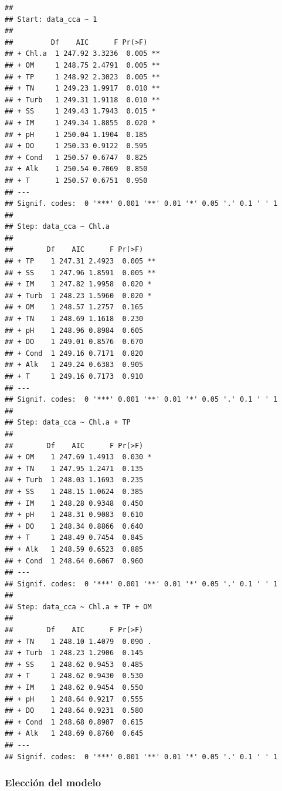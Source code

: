 \documentclass[
]{book}
\begin{document}
\begin{verbatim}
## 
## Start: data_cca ~ 1 
## 
##         Df    AIC      F Pr(>F)   
## + Chl.a  1 247.92 3.3236  0.005 **
## + OM     1 248.75 2.4791  0.005 **
## + TP     1 248.92 2.3023  0.005 **
## + TN     1 249.23 1.9917  0.010 **
## + Turb   1 249.31 1.9118  0.010 **
## + SS     1 249.43 1.7943  0.015 * 
## + IM     1 249.34 1.8855  0.020 * 
## + pH     1 250.04 1.1904  0.185   
## + DO     1 250.33 0.9122  0.595   
## + Cond   1 250.57 0.6747  0.825   
## + Alk    1 250.54 0.7069  0.850   
## + T      1 250.57 0.6751  0.950   
## ---
## Signif. codes:  0 '***' 0.001 '**' 0.01 '*' 0.05 '.' 0.1 ' ' 1
## 
## Step: data_cca ~ Chl.a 
## 
##        Df    AIC      F Pr(>F)   
## + TP    1 247.31 2.4923  0.005 **
## + SS    1 247.96 1.8591  0.005 **
## + IM    1 247.82 1.9958  0.020 * 
## + Turb  1 248.23 1.5960  0.020 * 
## + OM    1 248.57 1.2757  0.165   
## + TN    1 248.69 1.1618  0.230   
## + pH    1 248.96 0.8984  0.605   
## + DO    1 249.01 0.8576  0.670   
## + Cond  1 249.16 0.7171  0.820   
## + Alk   1 249.24 0.6383  0.905   
## + T     1 249.16 0.7173  0.910   
## ---
## Signif. codes:  0 '***' 0.001 '**' 0.01 '*' 0.05 '.' 0.1 ' ' 1
## 
## Step: data_cca ~ Chl.a + TP 
## 
##        Df    AIC      F Pr(>F)  
## + OM    1 247.69 1.4913  0.030 *
## + TN    1 247.95 1.2471  0.135  
## + Turb  1 248.03 1.1693  0.235  
## + SS    1 248.15 1.0624  0.385  
## + IM    1 248.28 0.9348  0.450  
## + pH    1 248.31 0.9083  0.610  
## + DO    1 248.34 0.8866  0.640  
## + T     1 248.49 0.7454  0.845  
## + Alk   1 248.59 0.6523  0.885  
## + Cond  1 248.64 0.6067  0.960  
## ---
## Signif. codes:  0 '***' 0.001 '**' 0.01 '*' 0.05 '.' 0.1 ' ' 1
## 
## Step: data_cca ~ Chl.a + TP + OM 
## 
##        Df    AIC      F Pr(>F)  
## + TN    1 248.10 1.4079  0.090 .
## + Turb  1 248.23 1.2906  0.145  
## + SS    1 248.62 0.9453  0.485  
## + T     1 248.62 0.9430  0.530  
## + IM    1 248.62 0.9454  0.550  
## + pH    1 248.64 0.9217  0.555  
## + DO    1 248.64 0.9231  0.580  
## + Cond  1 248.68 0.8907  0.615  
## + Alk   1 248.69 0.8760  0.645  
## ---
## Signif. codes:  0 '***' 0.001 '**' 0.01 '*' 0.05 '.' 0.1 ' ' 1
\end{verbatim}

\hypertarget{elecciuxf3n-del-modelo}{%
\subsubsection{Elección del modelo}\label{elecciuxf3n-del-modelo}}
\end{document}

